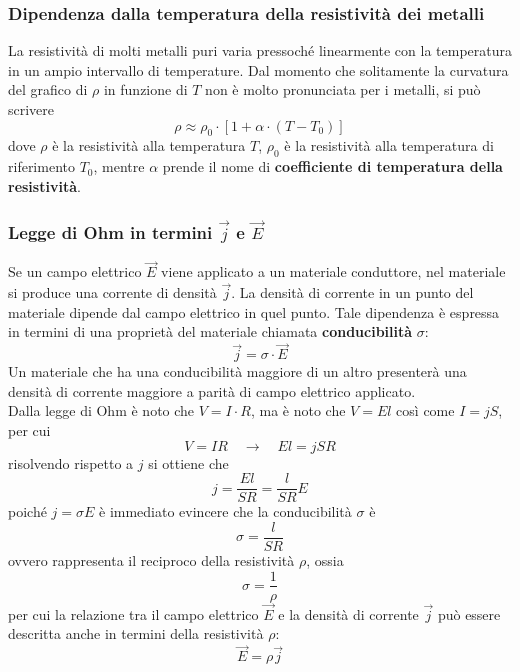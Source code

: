 \documentclass[a4paper]{extarticle}
\begin{document}
\vspace{1em}
\subsubsection{Dipendenza dalla temperatura della resistività dei metalli}
La resistività di molti metalli puri varia pressoché linearmente con la temperatura in un ampio intervallo di temperature. Dal momento che solitamente la curvatura del grafico di $\rho$ in funzione di $T$ non è molto pronunciata per i metalli, si può scrivere
\[\rho \approx \rho_0 \cdot \left[1 + \alpha \cdot (T-T_0)\right]\]
dove $\rho$ è la resistività alla temperatura $T$, $\rho_0$ è la resistività alla temperatura di riferimento $T_0$, mentre $\alpha$ prende il nome di \textbf{coefficiente di temperatura della resistività}.

\vspace{1em}
\subsubsection{Legge di Ohm in termini $\vec j$ e $\vec E$}
Se un campo elettrico $\vec E$ viene applicato a un materiale conduttore, nel materiale si produce una corrente di densità $\vec j$. La densità di corrente in un punto del materiale dipende dal campo elettrico in quel punto. Tale dipendenza è espressa in termini di una proprietà del materiale chiamata \textbf{conducibilità} $\sigma$:
\[\boxed{\vec j = \sigma \cdot \vec E}\]
Un materiale che ha una conducibilità maggiore di un altro presenterà una densità di corrente maggiore a parità di campo elettrico applicato.\\
Dalla legge di Ohm è noto che $V=I \cdot R$, ma è noto che $V=El$ così come $I=jS$, per cui
\[V = I R \hspace{1em} \rightarrow \hspace{1em} El = jS R\]
risolvendo rispetto a $j$ si ottiene che
\[j = \dfrac{E l}{S R} = \dfrac{l}{SR} E\]
poiché $j = \sigma E$ è immediato evincere che la conducibilità $\sigma$ è
\[\sigma = \dfrac{l}{S R}\]
ovvero rappresenta il reciproco della resistività $\rho$, ossia
\[\boxed{\sigma=\dfrac{1}{\rho}}\]
per cui la relazione tra il campo elettrico $\vec E$ e la densità di corrente $\vec j$ può essere descritta anche in termini della resistività $\rho$:
\[\boxed{\vec E = \rho \vec j}\]

\vspace{1em}
\noindent
\end{document}

